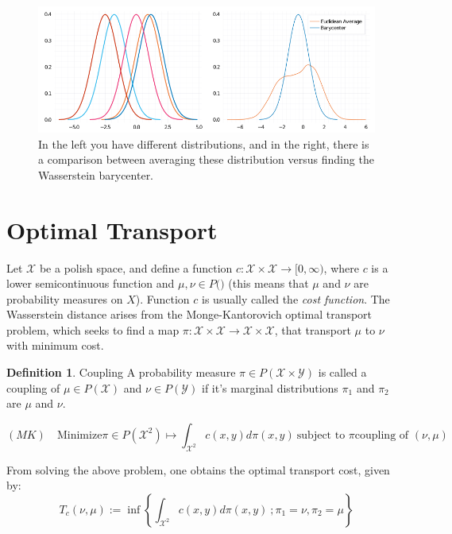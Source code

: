 \documentclass[10pt]{article}
\theoremstyle{definition}
\newtheorem{definition}{Definition}[section]
\begin{document}
\begin{figure}[h]
	\centering
	\includegraphics[width=14cm]{images/Barycenter.png}
    \caption{In the left you have different distributions, and in the right,
    there is a comparison between averaging these distribution versus finding the
    Wasserstein barycenter.}
    \label{fig:barycenter}
\end{figure}

\section{Optimal Transport}

Let $\mathcal X$ be a polish space, and define a function
$c: \mathcal X \times \mathcal X \rightarrow [0,\infty)$, where $c$ is a lower semicontinuous function and $\mu,\nu \in P(\mathcal)$ (this means that $\mu$ and $\nu$ are
probability measures on $X$). Function $c$ is usually called the \textit{cost function}.
The Wasserstein distance arises from the Monge-Kantorovich optimal transport problem, which
seeks to find a map
$\pi: \mathcal X \times \mathcal X \rightarrow \mathcal X \times \mathcal X$, that
transport $\mu$ to $\nu$ with minimum cost.

\theoremstyle{definition}
\begin{definition}{Coupling}
A probability measure $\pi \in P(\mathcal X \times \mathcal Y)$ is called a coupling of
$\mu \in P(\mathcal X)$ and $\nu \in P(\mathcal Y)$ if it's marginal distributions
$\pi_1$ and $\pi_2$ are
$\mu$ and $\nu$.
\end{definition}

\begin{equation*}
	(MK) \quad \text{Minimize} \pi \in P(\mathcal X^2) \mapsto
	\int_{\mathcal X^2} c(x,y) d\pi(x,y) \ \text{subject to } \pi
	\text{coupling of } (\nu,\mu)
\end{equation*}

From solving the above problem, one obtains the optimal transport cost, given by:
\begin{equation}
	T_c(\nu, \mu) :=
	\inf \left\{
		\int_{\mathcal X^2} c(x,y) d\pi(x,y) \ ; \pi_1 = \nu, \pi_2 = \mu
	\right\}
\end{equation}
\end{document}
